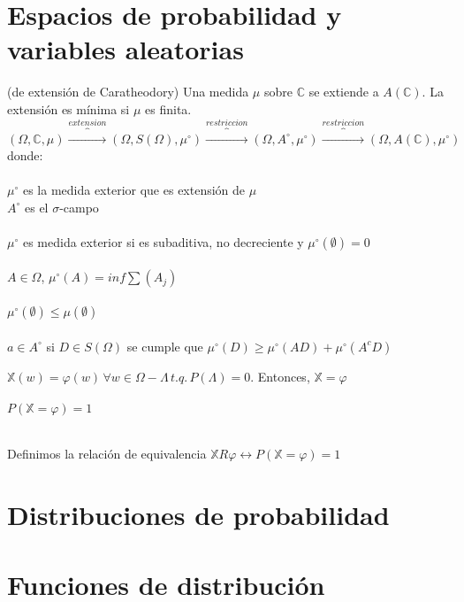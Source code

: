 \documentclass[12pt,a4paper]{book}
\begin{document}
\section{Espacios de probabilidad y variables aleatorias}
\begin{theorem} (de extensión de Caratheodory) 
Una medida $\mu$ sobre $\mathbb{C}$ se extiende a $A(\mathbb{C})$. La extensión es mínima si $\mu$ es finita.
$$(\Omega,\mathbb{C},\mu)\overbrace{\longrightarrow}^{extension}(\Omega,S(\Omega),\mu^\circ)\overbrace{\longrightarrow}^{restriccion}(\Omega,A^\circ,\mu^\circ)\overbrace{\longrightarrow}^{restriccion}(\Omega,A(\mathbb{C}),\mu^\circ)$$
donde:\\\\
$\mu^\circ$ es la medida exterior que es extensión de $\mu$\\
$A^\circ$ es el $\sigma$-campo\\\\
$\mu^\circ$ es medida exterior si es subaditiva, no decreciente y $\mu^\circ(\emptyset)=0$
\\\\
$A\in \Omega$, $\mu^\circ(A)=inf\displaystyle\sum(A_j)$\\\\
$\mu^\circ(\emptyset)\leq\mu(\emptyset)$\\\\
$a\in A^\circ$ si $D\in S(\Omega)$ se cumple que $\mu^\circ(D)\geq\mu^\circ(AD)+\mu^\circ(A^c D)$
\end{theorem}

\begin{lemma} 
$\mathbb{X}(w)=\varphi(w)\,\forall w \in \Omega - \Lambda\, t.q.\, P(\Lambda)=0$. Entonces, $\mathbb{X}=\varphi$ \\\\
$P(\mathbb{X}=\varphi)=1$\\\\
\end{lemma}
Definimos la relación de equivalencia $\mathbb{X}R\varphi\leftrightarrow P(\mathbb{X}=\varphi)=1$
\section{Distribuciones de probabilidad}
\section{Funciones de distribución}
\end{document}
